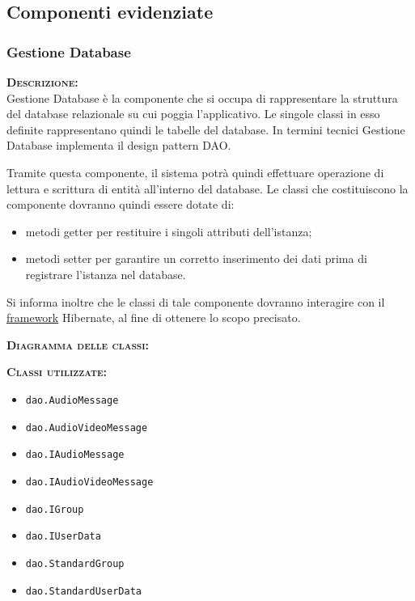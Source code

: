 \subsection{Componenti evidenziate}

\subsubsection{Gestione Database}
\begin{description}
\item{\scshape\bfseries Descrizione:}\\
Gestione Database è la componente che si occupa di rappresentare la struttura del database relazionale su cui poggia l'applicativo. Le singole classi in esso definite rappresentano quindi le tabelle del database. In termini tecnici Gestione Database implementa il design pattern DAO\@.

Tramite questa componente, il sistema potrà quindi effettuare operazione di lettura e scrittura di entità all'interno del database. Le classi che costituiscono la componente dovranno quindi essere dotate di:

\begin{itemize}
	\item metodi getter per restituire i singoli attributi dell'istanza;
	\item metodi setter per garantire un corretto inserimento dei dati prima di registrare l'istanza nel database.
\end{itemize}

Si informa inoltre che le classi di tale componente dovranno interagire con il \underline{framework} Hibernate, al fine di ottenere lo scopo precisato.

	\item{\scshape\bfseries Diagramma delle classi:}
	\item{\scshape\bfseries Classi utilizzate:}
\begin{itemize}
  \item \texttt{dao.AudioMessage}
  \item \texttt{dao.AudioVideoMessage}
  \item \texttt{dao.IAudioMessage}
  \item \texttt{dao.IAudioVideoMessage}
  \item \texttt{dao.IGroup}
  \item \texttt{dao.IUserData}
  \item \texttt{dao.StandardGroup}
  \item \texttt{dao.StandardUserData}
\end{itemize}
\end{description}

